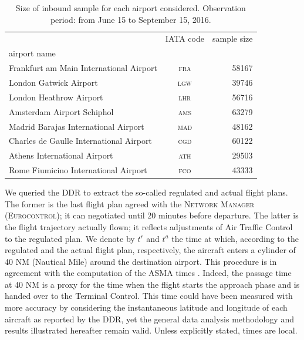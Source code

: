 \documentclass[final,review]{elsarticle}
\newcommand{\airp}[1]{\textcolor{#1}{\textsc{#1}}}
\begin{document}
\begin{table}[tbp]
  \caption{Size of inbound sample for each airport considered. Observation period: from June 15 to September 15, 2016.}\label{tab:flights_count}
    \begin{tabular}{lcr}
      \toprule
      {} & \acs{IATA} code &  sample size \\
      airport name                                       &                 &              \\
      \midrule
      Frankfurt am Main International Airport &     \airp{fra} &        58167 \\
      London Gatwick Airport                  &     \airp{lgw} &        39746 \\
      London Heathrow Airport                 &     \airp{lhr} &        56716 \\
      Amsterdam Airport Schiphol              &     \airp{ams} &        63279 \\
      Madrid Barajas International Airport    &     \airp{mad} &        48162 \\
      Charles de Gaulle International Airport &     \airp{cgd} &        60122 \\
      Athens International Airport            &     \airp{ath} &        29503 \\
      Rome Fiumicino International Airport    &     \airp{fco} &        43333 \\
      \bottomrule
    \end{tabular}
\end{table}

We queried the \ac{DDR} to extract the so-called regulated and actual flight plans.
The former is the last flight plan agreed with the \textsc{Network Manager (Eurocontrol)}; it can negotiated until 20 minutes before departure. The latter is the flight trajectory actually flown; it reflects adjustments of Air Traffic Control to the regulated plan.
We denote by \(t^r\) and \(t^a\) the time at which, according to the regulated and the actual flight plan, respectively, the aircraft enters a cylinder of 40 NM (Nautical Mile) around the destination airport.
This procedure is in agreement with the computation of the \ac{ASMA} times \citep{ASMA-def}.
Indeed, the passage time at 40 NM is a proxy for the time when the flight starts the approach phase and is handed over to the Terminal Control.
This time could have been measured with more accuracy by considering the instantaneous latitude and longitude of each aircraft as reported by the \ac{DDR}, yet the general data analysis methodology and results illustrated hereafter remain valid.
Unless explicitly stated, times are local.
\end{document}
